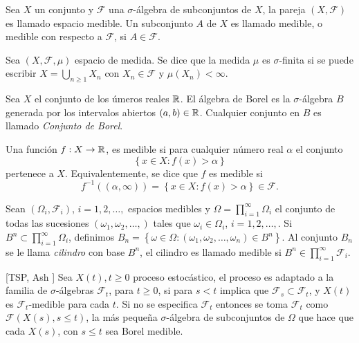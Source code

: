 \begin{Def}
Sea $X$ un conjunto y $\mathcal{F}$ una $\sigma$-\'algebra de
subconjuntos de $X$, la pareja $\left(X,\mathcal{F}\right)$ es
llamado espacio medible. Un subconjunto $A$ de $X$ es llamado
medible, o medible con respecto a $\mathcal{F}$, si
$A\in\mathcal{F}$.
\end{Def}

\begin{Def}
Sea $\left(X,\mathcal{F},\mu\right)$ espacio de medida. Se dice
que la medida $\mu$ es $\sigma$-finita si se puede escribir
$X=\bigcup_{n\geq1}X_{n}$ con $X_{n}\in\mathcal{F}$ y
$\mu\left(X_{n}\right)<\infty$.
\end{Def}

\begin{Def}\label{Cto.Borel}
Sea $X$ el conjunto de los \'umeros reales $\mathbb{R}$. El \'algebra de
Borel es la $\sigma$-\'algebra $B$ generada por los intervalos
abiertos $\left(a,b\right)\in\mathbb{R}$. Cualquier conjunto en $B$ es
llamado {\em Conjunto de Borel}.
\end{Def}

\begin{Def}\label{Funcion.Medible}
Una funci\'on $f:X\rightarrow\mathbb{R}$, es medible si para cualquier
n\'umero real $\alpha$ el conjunto
\[\left\{x\in X:f\left(x\right)>\alpha\right\}\]
pertenece a $X$. Equivalentemente, se dice que $f$ es medible si
\[f^{-1}\left(\left(\alpha,\infty\right)\right)=\left\{x\in X:f\left(x\right)>\alpha\right\}\in\mathcal{F}.\]
\end{Def}


\begin{Def}\label{Def.Cilindros}
Sean $\left(\Omega_{i},\mathcal{F}_{i}\right)$, $i=1,2,\ldots,$
espacios medibles y $\Omega=\prod_{i=1}^{\infty}\Omega_{i}$ el
conjunto de todas las sucesiones
$\left(\omega_{1},\omega_{2},\ldots,\right)$ tales que
$\omega_{i}\in\Omega_{i}$, $i=1,2,\ldots,$. Si
$B^{n}\subset\prod_{i=1}^{\infty}\Omega_{i}$, definimos
$B_{n}=\left\{\omega\in\Omega:\left(\omega_{1},\omega_{2},\ldots,\omega_{n}\right)\in
B^{n}\right\}$. Al conjunto $B_{n}$ se le llama {\em cilindro} con
base $B^{n}$, el cilindro es llamado medible si
$B^{n}\in\prod_{i=1}^{\infty}\mathcal{F}_{i}$.
\end{Def}


\begin{Def}\label{Def.Proc.Adaptado}[TSP, Ash \cite{RBA}]
Sea $X\left(t\right),t\geq0$ proceso estoc\'astico, el proceso es
adaptado a la familia de $\sigma$-\'algebras $\mathcal{F}_{t}$,
para $t\geq0$, si para $s<t$ implica que
$\mathcal{F}_{s}\subset\mathcal{F}_{t}$, y $X\left(t\right)$ es
$\mathcal{F}_{t}$-medible para cada $t$. Si no se especifica
$\mathcal{F}_{t}$ entonces se toma $\mathcal{F}_{t}$ como
$\mathcal{F}\left(X\left(s\right),s\leq t\right)$, la m\'as
peque\~na $\sigma$-\'algebra de subconjuntos de $\Omega$ que hace
que cada $X\left(s\right)$, con $s\leq t$ sea Borel medible.
\end{Def}


